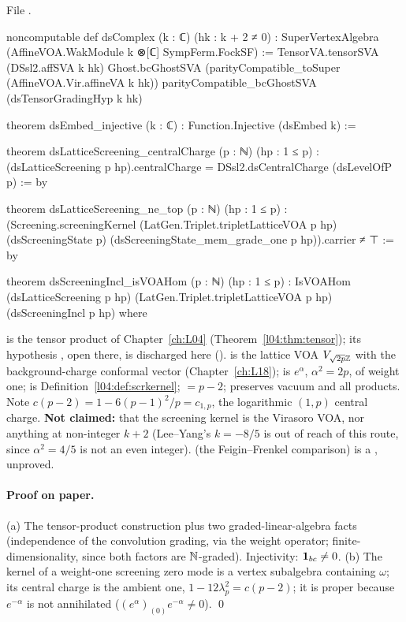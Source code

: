 \noindent File .
\begin{leancode}
noncomputable def dsComplex (k : ℂ) (hk : k + 2 ≠ 0) :
    SuperVertexAlgebra (AffineVOA.WakModule k ⊗[ℂ] SympFerm.FockSF) :=
  TensorVA.tensorSVA (DSsl2.affSVA k hk) Ghost.bcGhostSVA
    (parityCompatible_toSuper (AffineVOA.Vir.affineVA k hk)) parityCompatible_bcGhostSVA
    (dsTensorGradingHyp k hk)

theorem dsEmbed_injective (k : ℂ) : Function.Injective (dsEmbed k) :=

theorem dsLatticeScreening_centralCharge (p : ℕ) (hp : 1 ≤ p) :
    (dsLatticeScreening p hp).centralCharge = DSsl2.dsCentralCharge (dsLevelOfP p) := by

theorem dsLatticeScreening_ne_top (p : ℕ) (hp : 1 ≤ p) :
    (Screening.screeningKernel (LatGen.Triplet.tripletLatticeVOA p hp)
      (dsScreeningState p) (dsScreeningState_mem_grade_one p hp)).carrier ≠ ⊤ := by

theorem dsScreeningIncl_isVOAHom (p : ℕ) (hp : 1 ≤ p) :
    IsVOAHom (dsLatticeScreening p hp) (LatGen.Triplet.tripletLatticeVOA p hp)
      (dsScreeningIncl p hp) where
\end{leancode}

\begin{dictionary}
 is the tensor product of Chapter~\ref{ch:L04} (Theorem~\ref{l04:thm:tensor}); its
hypothesis , open there, is discharged here ().
 is the lattice VOA $V_{\sqrt{2p}{\mathbb{Z}}}$ with the background-charge conformal vector
(Chapter~\ref{ch:L18});  is $e^{\alpha}$, $\alpha^2 = 2p$, of weight one;
 is Definition~\ref{l04:def:scrkernel};  $= p-2$;
 preserves vacuum and all products. Note $c(p-2) = 1-6(p-1)^2/p = c_{1,p}$, the logarithmic
$(1,p)$ central charge. \textbf{Not claimed:} that the screening kernel is the Virasoro VOA, nor anything at
non-integer $k+2$ (Lee--Yang's $k=-8/5$ is out of reach of this route, since $\alpha^2 = 4/5$ is not an even
integer).  (the Feigin--Frenkel comparison) is a , unproved.
\end{dictionary}

\paragraph{Proof on paper.} (a) The tensor-product construction plus two graded-linear-algebra facts
(independence of the convolution grading, via the weight operator; finite-dimensionality, since both factors
are ${\mathbb{N}}$-graded). Injectivity: $\mathbf{1}_{bc}\ne0$. (b) The kernel of a weight-one screening zero mode is a
vertex subalgebra containing $\omega$; its central charge is the ambient one, $1-12\lambda_p^2 = c(p-2)$; it is
proper because $e^{-\alpha}$ is not annihilated ($(e^\alpha)_{(0)}e^{-\alpha}\ne0$). \qed

